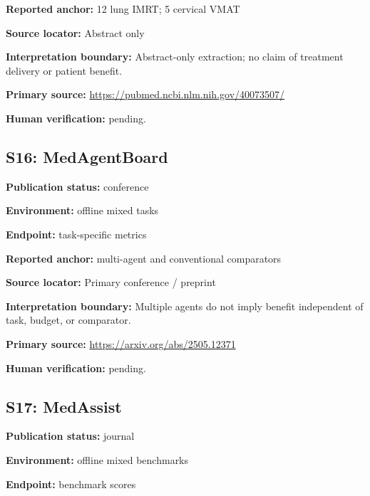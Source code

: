 \documentclass[journal,onecolumn,10pt]{IEEEtran}
\begin{document}
\noindent\textbf{Reported anchor:} 12 lung IMRT; 5 cervical VMAT\par

\noindent\textbf{Source locator:} Abstract only\par

\noindent\textbf{Interpretation boundary:} Abstract-only extraction; no claim of treatment delivery or patient benefit.\par

\noindent\textbf{Primary source:} \url{https://pubmed.ncbi.nlm.nih.gov/40073507/}\par
\noindent\textbf{Human verification:} pending.

\subsection*{S16: MedAgentBoard}

\noindent\textbf{Publication status:} conference\par

\noindent\textbf{Environment:} offline mixed tasks\par

\noindent\textbf{Endpoint:} task-specific metrics\par

\noindent\textbf{Reported anchor:} multi-agent and conventional comparators\par

\noindent\textbf{Source locator:} Primary conference / preprint\par

\noindent\textbf{Interpretation boundary:} Multiple agents do not imply benefit independent of task, budget, or comparator.\par

\noindent\textbf{Primary source:} \url{https://arxiv.org/abs/2505.12371}\par
\noindent\textbf{Human verification:} pending.

\subsection*{S17: MedAssist}

\noindent\textbf{Publication status:} journal\par

\noindent\textbf{Environment:} offline mixed benchmarks\par

\noindent\textbf{Endpoint:} benchmark scores\par
\end{document}
